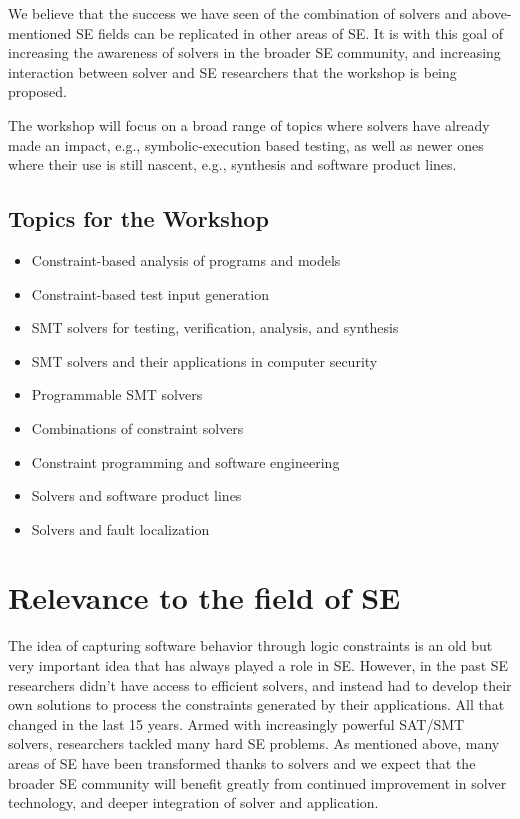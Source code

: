 \documentclass{sig-alternate}
\begin{document}
\vspace{0.2cm} We believe that the success we have seen of the
combination of solvers and above-mentioned SE fields can be replicated
in other areas of SE. It is with this goal of increasing the awareness
of solvers in the broader SE community, and increasing interaction
between solver and SE researchers that the workshop is being proposed.

\vspace{0.2cm} The workshop will focus on a broad range of topics
where solvers have already made an impact, e.g., symbolic-execution
based testing, as well as newer ones where their use is still nascent,
e.g., synthesis and software product lines.

\subsection*{Topics for the Workshop}
\vspace{0.2cm}

\begin{itemize}
\item Constraint-based analysis of programs and models
\item Constraint-based test input generation
\item SMT solvers for testing, verification, analysis, and synthesis
\item SMT solvers and their applications in computer security
\item Programmable SMT solvers
\item Combinations of constraint solvers
\item Constraint programming and software engineering
\item Solvers and software product lines
\item Solvers and fault localization
\end{itemize}

\section{Relevance to the field of SE}
\vspace{0.2cm} The idea of capturing software behavior through logic
constraints is an old but very important idea that has always played a
role in SE.  However, in the past SE researchers didn't have access to
efficient solvers, and instead had to develop their own solutions to
process the constraints generated by their applications. All that
changed in the last 15 years. Armed with increasingly powerful SAT/SMT
solvers, researchers tackled many hard SE problems. As mentioned
above, many areas of SE have been transformed thanks to solvers and we
expect that the broader SE community will benefit greatly from
continued improvement in solver technology, and deeper integration of
solver and application.
\end{document}
